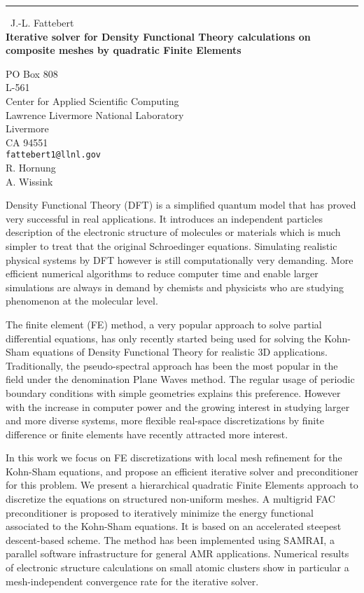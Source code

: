 \documentclass{report}
\begin{document}
\begin{center}
\rule{6in}{1pt} \
{\large J.-L. Fattebert \\
{\bf Iterative solver for Density Functional Theory calculations on composite meshes by quadratic Finite Elements}}

PO Box 808 \\ L-561 \\ Center for Applied Scientific Computing \\ Lawrence Livermore National Laboratory \\ Livermore \\ CA 94551
\\
{\tt fattebert1@llnl.gov}\\
R. Hornung\\
A. Wissink\end{center}

Density Functional Theory (DFT) is a simplified quantum model that
has proved very successful in real applications. It introduces an
independent particles description of the electronic structure of
molecules or materials which is much simpler to treat that the
original Schroedinger equations.
Simulating realistic
physical systems by DFT however is still computationally very
demanding. More efficient numerical algorithms to reduce computer
time and enable larger simulations are always in demand by
chemists and physicists who are studying phenomenon at the
molecular level.

The finite element (FE) method, a very popular approach to solve
partial differential equations, has only recently started being
used for solving the Kohn-Sham equations of Density Functional
Theory for realistic 3D applications. Traditionally, the
pseudo-spectral approach has been the most popular in the field
under the denomination Plane Waves method. The regular usage of
periodic boundary conditions with simple geometries explains this
preference. However with the increase in computer power and the
growing interest in studying larger and more diverse systems,
more flexible real-space discretizations by finite difference or finite
elements have recently attracted more interest.

In this work we focus on FE discretizations with local mesh refinement
for the Kohn-Sham equations, and propose an efficient iterative solver and
preconditioner for this problem.
We present a hierarchical quadratic Finite Elements approach to discretize the
equations on structured non-uniform meshes.
A multigrid FAC preconditioner is proposed to iteratively minimize the energy
functional associated to the Kohn-Sham equations.
It is based on an accelerated steepest descent-based scheme.
The method has been implemented using SAMRAI, a parallel software
infrastructure for general AMR applications.
Numerical results of electronic structure calculations on small atomic
clusters show in particular a mesh-independent convergence rate for the iterative solver.
\end{document}
